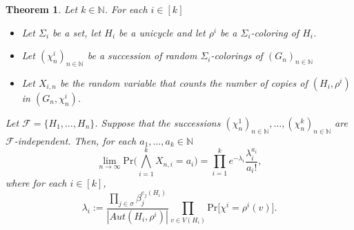 \documentclass[12pt,notitlepage,a4paper]{article}
\newtheorem{theorem}{Theorem}[section]
\theoremstyle{definition}
\newcommand{\N}{\mathbb{N}}
\newcommand{\Ln}{\lim\limits_{n\to \infty}}
\begin{document}
\begin{theorem}
	Let $k\in \N$. For each $i\in [k]$ 
	\begin{itemize}
		\item Let $\Sigma_i$ be a set, let $H_i$ be a unicycle and 
		let $\rho^i$ be a $\Sigma_i$-coloring of $H_i$.
		\item Let $(\chi^i_n)_{n\in\N}$ be a succession of
		random $\Sigma_i$-colorings of $(G_n)_{n\in \N}$
		\item Let $X_{i,n}$ be the random variable that counts
		the number of copies of $(H_i, \rho^i)$ in
		$(G_n,\chi^i_n)$.				
	\end{itemize}
	Let $\mathcal{F}=\{H_1,\dots, H_n\}$. Suppose that the
	successions $(\chi^1_n)_{n\in\N}, \dots, (\chi^k_n)_{n\in\N}$
	are $\mathcal{F}$-independent. Then, for each $a_1,\dots,a_k\in \N$
	\[
	\Ln \mathrm{Pr}\big( \bigwedge_{i=1}^k X_{n,i}=a_i  \big)=
	\prod_{i=1}^{k}e^{-\lambda_i}\frac{\lambda_i^{a_i}}{a_i!},
	\]
	where for each $i\in [k]$,
	\[
	\lambda_i:= \frac{\prod_{j\in \sigma} \beta_j^{e_j(H_i)}}{|Aut(H_i,\rho^i)|} 
	\prod_{v\in V(H_i)} \mathrm{Pr}\big[\chi^i=\rho^i(v)\big].
	\]
\end{theorem}
\end{document}
